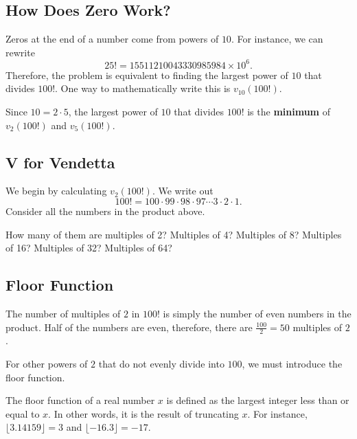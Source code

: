 \clearpage 

\subsection*{How Does Zero Work?}

Zeros at the end of a number come from powers of $10$.  For instance, we can rewrite $$25!=15511210043330985984\times 10^6.$$  
Therefore, the problem is equivalent to finding the largest power of $10$ that divides $100!$.  One way to mathematically write this is $v_{10}(100!)$.  

Since $10=2\cdot 5$, the largest power of $10$ that divides $100!$ is the \textbf{minimum} of $v_2(100!)$ and $v_5(100!)$.  

\subsection*{V for Vendetta}

We begin by calculating $v_2(100!)$. We write out $$100!=100\cdot 99\cdot 98\cdot 97\cdots 3\cdot 2\cdot 1.$$  Consider all the numbers in the product above. 

How many of them are multiples of 2?  Multiples of 4?  Multiples of 8?  Multiples of 16?  Multiples of 32?  Multiples of 64?  

\clearpage 

\subsection*{Floor Function}

The number of multiples of $2$ in $100!$ is simply the number of even numbers in the product. Half of the numbers are even, therefore, there are $\frac{100}{2}=50$ multiples of $2$.  

For other powers of $2$ that do not evenly divide into $100$, we must introduce the floor function.  

\begin{defi} The floor function of a real number $x$ is defined as the largest integer less than or equal to $x$. In other words, it is the result of truncating $x$. For instance, $\lfloor 3.14159 \rfloor=3$ and $\lfloor -16.3 \rfloor=-17$. \end{defi}

\clearpage

